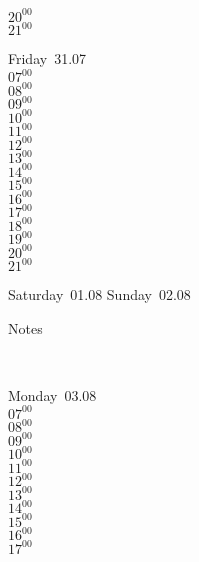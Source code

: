 \documentclass[11pt,a4paper]{book}\usepackage[]{graphicx}\usepackage[]{color}
\begin{document}
{{{{\begin{tcolorbox}
{$20^{00}$\\
$21^{00}$}\\
\end{tcolorbox} 
%
\begin{tcolorbox}
Friday~31.07\\
{ 
$07^{00}$\\
$08^{00}$\\
$09^{00}$\\
$10^{00}$\\
$11^{00}$\\
$12^{00}$\\
$13^{00}$\\
$14^{00}$\\
$15^{00}$\\
$16^{00}$\\
$17^{00}$\\
$18^{00}$\\
$19^{00}$\\
$20^{00}$\\
$21^{00}$}\\
\end{tcolorbox} 
%
\begin{tcolorbox}[height=(\textheight-10mm)/6]
Saturday~01.08
\tcblower
Sunday~02.08
\end{tcolorbox} %
%
\begin{tcolorbox}[height=(\textheight-10mm)/6,sidebyside=false]
Notes
\end{tcolorbox}
\clearpage
\vspace{2 mm}\\
%
%
\begin{tcolorbox}
Monday~03.08\\
{ 
$07^{00}$\\
$08^{00}$\\
$09^{00}$\\
$10^{00}$\\
$11^{00}$\\
$12^{00}$\\
$13^{00}$\\
$14^{00}$\\
$15^{00}$\\
$16^{00}$\\
$17^{00}$\\
}
\end{tcolorbox}}}}}
\end{document}
